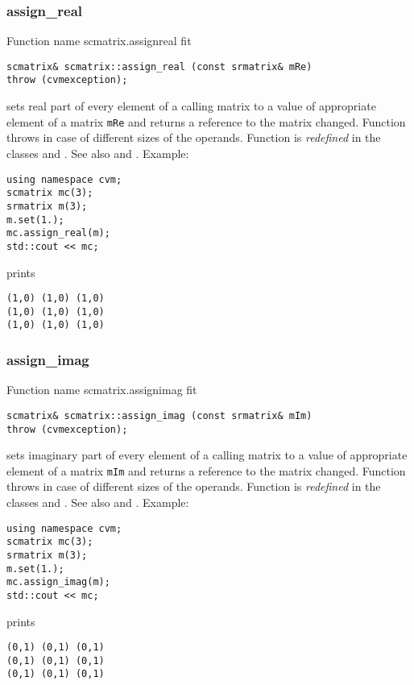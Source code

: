 \subsubsection{assign\_real}
Function%
\pdfdest name {scmatrix.assignreal} fit
\begin{verbatim}
scmatrix& scmatrix::assign_real (const srmatrix& mRe)
throw (cvmexception);
\end{verbatim}
sets real part of every element of a calling matrix to a value of
appropriate element of a matrix \verb"mRe"
and returns a reference to
the matrix changed.
Function throws  
in case of different sizes of the operands.
Function is \emph{redefined} in the classes
and .
See also  and .
Example:
\begin{Verbatim}
using namespace cvm;
scmatrix mc(3);
srmatrix m(3);
m.set(1.);
mc.assign_real(m);
std::cout << mc;
\end{Verbatim}
prints
\begin{Verbatim}
(1,0) (1,0) (1,0)
(1,0) (1,0) (1,0)
(1,0) (1,0) (1,0)
\end{Verbatim}
\newpage




\subsubsection{assign\_imag}
Function%
\pdfdest name {scmatrix.assignimag} fit
\begin{verbatim}
scmatrix& scmatrix::assign_imag (const srmatrix& mIm)
throw (cvmexception);
\end{verbatim}
sets imaginary part of every element of a calling matrix to a value of
appropriate element of a matrix \verb"mIm"
and returns a reference to
the matrix changed.
Function throws  
in case of different sizes of the operands.
Function is \emph{redefined} in the classes
and .
See also  and .
Example:
\begin{Verbatim}
using namespace cvm;
scmatrix mc(3);
srmatrix m(3);
m.set(1.);
mc.assign_imag(m);
std::cout << mc;
\end{Verbatim}
prints
\begin{Verbatim}
(0,1) (0,1) (0,1)
(0,1) (0,1) (0,1)
(0,1) (0,1) (0,1)
\end{Verbatim}
\newpage




